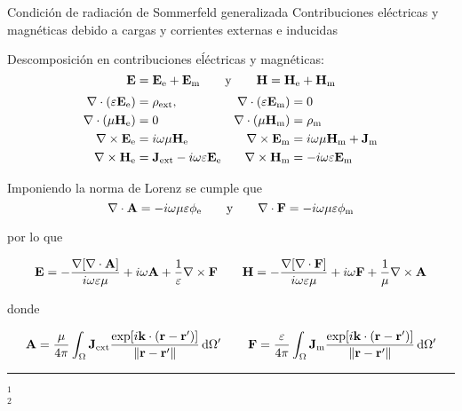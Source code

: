 \begin{frame}{Condición de radiación de Sommerfeld generalizada}
{Contribuciones eléctricas y magnéticas debido a cargas y corrientes externas e inducidas}\small

Descomposición en contribuciones eĺéctricas y magnéticas:
$$
\vb{E} =  \vb{E}_\text{e} +  \vb{E}_\text{m}\qquad \text{y} \qquad \vb{H} =  \vb{H}_\text{e} +  \vb{H}_\text{m}
$$
\begin{align*}
    \nabla \cdot \qty(\varepsilon \vb{E}_\text{e})  &= \rho_\text{ext},
                    &\nabla \cdot \qty(\varepsilon \vb{E}_\text{m})  &= 0\\
    \nabla \cdot  (\mu\vb{H}_\text{e})  &= 0
                    & \nabla \cdot  (\mu\vb{H}_\text{m})  &= \rho_\text{m}\\
    \nabla \times \vb{E}_\text{e}  &= i\omega \mu \vb{H}_\text{e}
                    & \nabla \times \vb{E}_\text{m}  &= i\omega \mu \vb{H}_\text{m} + \vb{J}_\text{m}\\
    \nabla \times \vb{H}_\text{e}  &= \vb{J}_\text{ext} - i\omega \varepsilon \vb{E}_\text{e}
                & \nabla \times \vb{H}_\text{m}  &=- i\omega \varepsilon \vb{E}_\text{m}
\end{align*}

Imponiendo la norma de Lorenz se cumple que
$$\nabla\cdot\vb{A} = -i\omega\mu\varepsilon \phi_\text{e}\qquad \text{y} \qquad \nabla\cdot\vb{F} = -i\omega\mu\varepsilon \phi_\text{m}$$

por lo que

\begin{align*}
    \vb{E} = - \dfrac{\nabla[\nabla\cdot\vb{A}]}{i\omega\varepsilon\mu} + i \omega\vb{A} + \dfrac{1}{\varepsilon}\nabla\times\vb{F}
    \qquad
    \vb{H} =- \dfrac{\nabla[\nabla\cdot\vb{F}]}{i\omega\varepsilon\mu} + i \omega\vb{F} + \dfrac{1}{\mu}\nabla\times\vb{A}
\end{align*}

donde

\begin{align*}
    \vb{A} = \dfrac{\mu}{4\pi} \int_\Omega \vb{J}_\text{ext}  \dfrac{\exp[i\vb{k}\cdot(\vb{r}-\vb{r}')]}{\norm{\vb{r}-\vb{r}'}}\dd{\Omega'}
    \qquad
    \vb{F} = \dfrac{\varepsilon}{4\pi} \int_\Omega \vb{J}_\text{m}  \dfrac{\exp[i\vb{k}\cdot(\vb{r}-\vb{r}')]}{\norm{\vb{r}-\vb{r}'}}\dd{\Omega'}
\end{align*}

%
	\noindent\rule{.25\textwidth}{0.4pt}
 \begin{spacing}{0}\fontsize{4}{12} \selectfont
	$^1$ \\
	$^2$ 
	\end{spacing}
\end{frame}

